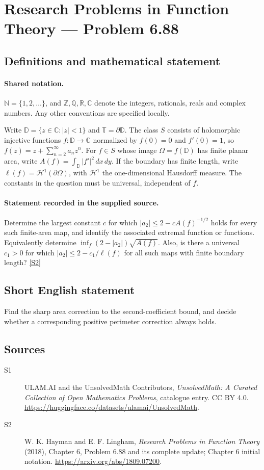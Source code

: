 \documentclass[11pt]{article}
\newcommand{\sref}[2]{\hyperlink{source:#1:#2}{[S#2]}}
\begin{document}
\section{Research Problems in Function Theory — Problem 6.88}\label{statement}

\subsection{Definitions and mathematical statement}

\paragraph{Shared notation.}$\mathbb N=\{1,2,\ldots\}$, and $\mathbb Z,\mathbb Q,\mathbb R,\mathbb C$ denote the integers, rationals, reals and complex numbers. Any other conventions are specified locally.


Write $\mathbb D=\{z\in\mathbb C:|z|<1\}$ and $\mathbb T=\partial\mathbb D$. The class $S$ consists of holomorphic injective functions $f:\mathbb D\to\mathbb C$ normalized by $f(0)=0$ and $f'(0)=1$, so $f(z)=z+\sum_{n=2}^{\infty}a_nz^n$. For $f\in S$ whose image $\Omega=f(\mathbb D)$ has finite planar area, write $A(f)=\int_{\mathbb D}|f'|^2\,dx\,dy$. If the boundary has finite length, write $\ell(f)=\mathcal H^1(\partial\Omega)$, with $\mathcal H^1$ the one-dimensional Hausdorff measure. The constants in the question must be universal, independent of $f$.
\paragraph{Statement recorded in the supplied source.}
Determine the largest constant $c$ for which $|a_2|\le2-cA(f)^{-1/2}$ holds for every such finite-area map, and identify the associated extremal function or functions. Equivalently determine $\inf_f (2-|a_2|)\sqrt{A(f)}$. Also, is there a universal $c_1>0$ for which $|a_2|\le2-c_1/\ell(f)$ for all such maps with finite boundary length? \sref{statement}{2}
\subsection{Short English statement}
Find the sharp area correction to the second-coefficient bound, and decide whether a corresponding positive perimeter correction always holds.
\subsection{Sources}
\begin{description}
\item[\hypertarget{source:statement:1}{S1}] ULAM.AI and the UnsolvedMath Contributors, \emph{UnsolvedMath: A Curated Collection of Open Mathematics Problems}, catalogue entry. CC BY 4.0. \url{https://huggingface.co/datasets/ulamai/UnsolvedMath}.
\item[\hypertarget{source:statement:2}{S2}] W. K. Hayman and E. F. Lingham, \emph{Research Problems in Function Theory} (2018), Chapter 6, Problem 6.88 and its complete update; Chapter 6 initial notation. \url{https://arxiv.org/abs/1809.07200}.
\end{description}
\label{end:statement}
\end{document}
